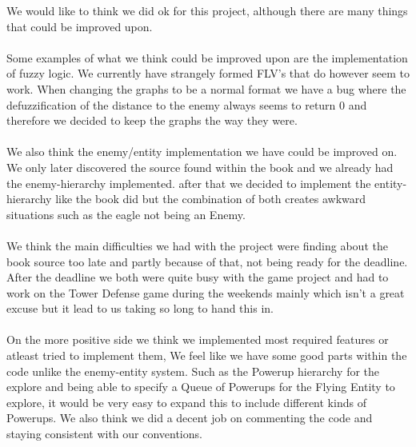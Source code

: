 We would like to think we did ok for this project, although there are many things that could be improved upon. \\\\ Some examples of what we think could be improved upon are the implementation of fuzzy logic. We currently have strangely formed FLV's that do however seem to work. When changing the graphs to be a normal format we have a bug where the defuzzification of the distance to the enemy always seems to return 0 and therefore we decided to keep the graphs the way they were. \\\\ We also think the enemy/entity implementation we have could be improved on. We only later discovered the source found within the book and we already had the enemy-hierarchy implemented. after that we decided to implement the entity-hierarchy like the book did but the combination of both creates awkward situations such as the eagle not being an Enemy. \\\\ We think the main difficulties we had with the project were finding about the book source too late and partly because of that, not being ready for the deadline. After the deadline we both were quite busy with the game project and had to work on the Tower Defense game during the weekends mainly which isn't a great excuse but it lead to us taking so long to hand this in. \\\\ On the more positive side we think we implemented most required features or atleast tried to implement them, We feel like we have some good parts within the code unlike the enemy-entity system. Such as the Powerup hierarchy for the explore and being able to specify a Queue of Powerups for the Flying Entity to explore, it would be very easy to expand this to include different kinds of Powerups. We also think we did a decent job on commenting the code and staying consistent with our conventions.